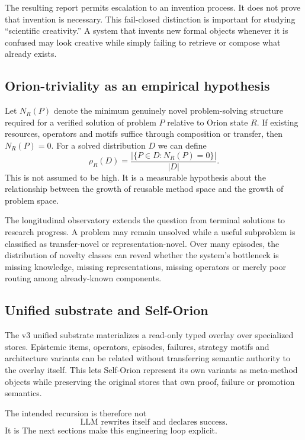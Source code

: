 The resulting report permits escalation to an invention process. It does not prove that invention is necessary. This fail-closed distinction is important for studying ``scientific creativity.'' A system that invents new formal objects whenever it is confused may look creative while simply failing to retrieve or compose what already exists.

\subsection{Orion-triviality as an empirical hypothesis}

Let $N_R(P)$ denote the minimum genuinely novel problem-solving structure required for a verified solution of problem $P$ relative to Orion state $R$. If existing resources, operators and motifs suffice through composition or transfer, then $N_R(P)=0$. For a solved distribution $D$ we can define
\[
\rho_R(D)=\frac{|\{P\in D:N_R(P)=0\}|}{|D|}.
\]
This is not assumed to be high. It is a measurable hypothesis about the relationship between the growth of reusable method space and the growth of problem space.

The longitudinal observatory extends the question from terminal solutions to research progress. A problem may remain unsolved while a useful subproblem is classified as transfer-novel or representation-novel. Over many episodes, the distribution of novelty classes can reveal whether the system's bottleneck is missing knowledge, missing representations, missing operators or merely poor routing among already-known components.

\subsection{Unified substrate and Self-Orion}

The v3 unified substrate materializes a read-only typed overlay over specialized stores. Epistemic items, operators, episodes, failures, strategy motifs and architecture variants can be related without transferring semantic authority to the overlay itself. This lets Self-Orion represent its own variants as meta-method objects while preserving the original stores that own proof, failure or promotion semantics.

The intended recursion is therefore not
\[
\text{LLM rewrites itself and declares success}.
\]
It is
The next sections make this engineering loop explicit.
